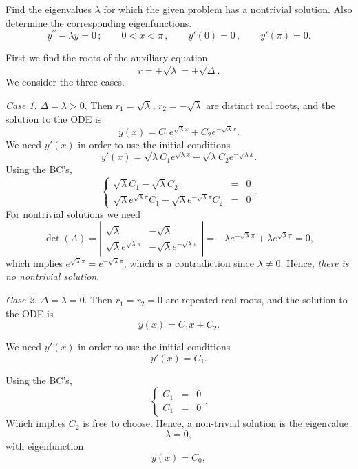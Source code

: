 \documentclass[11pt]{article}
\begin{document}
\begin{problem}
Find the eigenvalues $\lambda$ for which the given problem has a nontrivial solution. Also determine the corresponding eigenfunctions.
\begin{equation*}
y^{\prime \prime} - \lambda y =0\,; \qquad  0<x<\pi \,, \qquad y'(0)=0  \,,\qquad y'(\pi) =0. 
\end{equation*}
\end{problem}
\begin{solution}
First we find the roots of the auxiliary equation.
\[r=\pm\sqrt{\lambda}=\pm\sqrt{\Delta}.\]
We consider the three cases.

\par \textsl{Case 1.} $\Delta = \lambda >0$. Then $r_{1}=\sqrt{\lambda}$, $r_{2}=-\sqrt{\lambda}$ are distinct real roots, and the solution to the ODE is
\[y(x)=C_{1}e^{\sqrt{\lambda}x}+C_{2}e^{-\sqrt{\lambda}x}.\]
We need $y'(x)$ in order to use the initial conditions
\[y'(x)=\sqrt{\lambda}C_{1}e^{\sqrt{\lambda}x}-\sqrt{\lambda}C_{2}e^{-\sqrt{\lambda}x}.\]
Using the BC's,
\begin{equation*}
\left\{\begin{array}{rcl}
       \sqrt{\lambda}C_{1} -\sqrt{\lambda}C_{2} & = & 0\\
       \sqrt{\lambda}e^{\sqrt{\lambda}\pi}C_{1} - \sqrt{\lambda} e^{-\sqrt{\lambda}\pi}C_{2}& = & 0
      \end{array}\right. .
\end{equation*}
For nontrivial solutions we need 
$$\det(A)=\left|\begin{matrix}\sqrt{\lambda}&-\sqrt{\lambda}\\ \sqrt{\lambda}e^{\sqrt{\lambda}\pi} & - \sqrt{\lambda} e^{-\sqrt{\lambda}\pi}\end{matrix}\right|=-\lambda e^{-\sqrt{\lambda}\pi}+\lambda e^{\sqrt{\lambda}\pi}=0,$$ 
which implies $e^{\sqrt{\lambda}\pi}=e^{-\sqrt{\lambda}\pi}$, which is a contradiction since $\lambda\neq 0$. Hence, \textsl{there is no nontrivial solution}.


\par \textsl{Case 2.} $\Delta = \lambda =0$. Then $r_{1}=r_{2}=0$ are repeated real roots, and the solution to the ODE is
\[y(x)=C_{1}x+C_{2}.\]

We need $y'(x)$ in order to use the initial conditions
\[y'(x)=C_{1}.\]

Using the BC's,
\begin{equation*}
\left\{\begin{array}{rcl}
       C_{1} & = & 0\\
       C_{1} & = & 0
      \end{array}\right. .
\end{equation*}
Which implies $C_{2}$ is free to choose. Hence,  a non-trivial solution is the eigenvalue
\[\boxed{\lambda=0},\]
with eigenfunction
\[\boxed{y(x)=C_{0}},\]


\end{solution}
\end{document}
